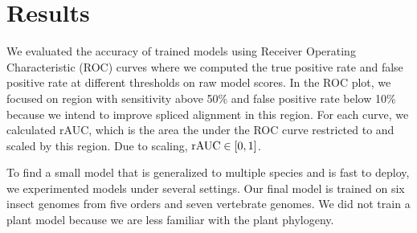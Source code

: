\documentclass[webpdf,contemporary,large,namedate]{oup-authoring-template}%
\begin{document}
\section{Results}

We evaluated the accuracy of trained models using Receiver Operating Characteristic (ROC) curves
where we computed the true positive rate and false positive rate at different thresholds on raw model scores.
In the ROC plot, we focused on region with sensitivity above 50\% and false positive rate below 10\%
because we intend to improve spliced alignment in this region.
For each curve, we calculated rAUC, which is the area the under the ROC curve restricted to and scaled by this region.
Due to scaling, ${\rm rAUC}\in[0,1]$.

To find a small model that is generalized to multiple species and is fast to deploy,
we experimented models under several settings.
Our final model is trained on six insect genomes from five orders and seven vertebrate genomes.
We did not train a plant model because we are less familiar with the plant phylogeny.
\end{document}
